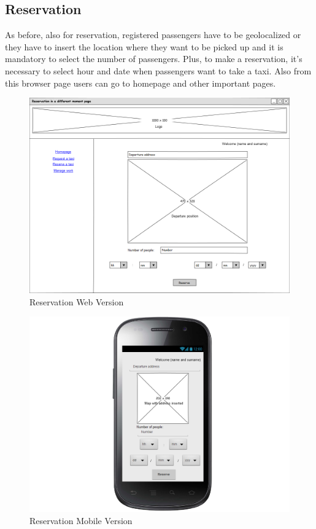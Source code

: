 \subsection{Reservation}
As before, also for reservation, registered passengers have to be geolocalized or they have to insert the location where they want to be picked up and it is mandatory to select the number of passengers. Plus, to make a reservation, it's necessary to select hour and date when passengers want to take a taxi. \newline Also from this browser page users can go to homepage and other important pages. 
\begin{figure}[H]
\centering
\includegraphics[scale=0.35]{mockups/reservation_web.png}
\caption{Reservation Web Version}
\end{figure}
\begin{figure}[H]
\centering
\includegraphics[scale=0.35]{mockups/reservation_mobile.png}
\caption{Reservation Mobile Version}
\end{figure}
\break
